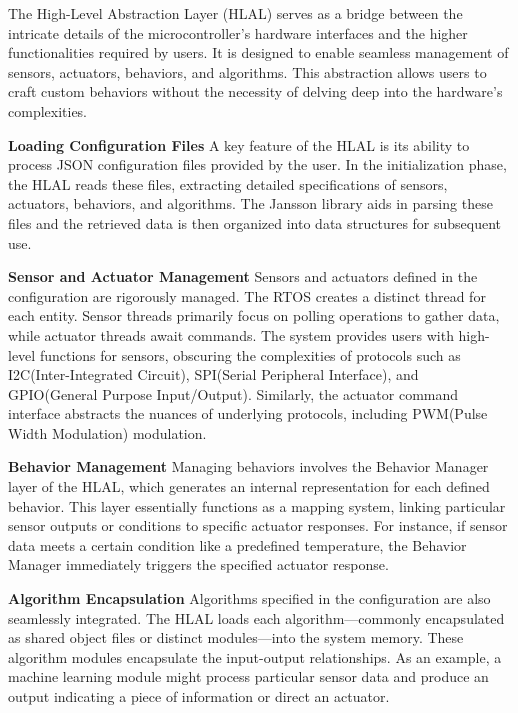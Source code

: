 \documentclass[runningheads]{llncs}
\begin{document}
The High-Level Abstraction Layer (HLAL) serves as a bridge between the intricate details of the microcontroller's hardware interfaces and the higher functionalities required by users. It is designed to enable seamless management of sensors, actuators, behaviors, and algorithms. This abstraction allows users to craft custom behaviors without the necessity of delving deep into the hardware's complexities.

\vspace{0.5cm}
\noindent\textbf{Loading Configuration Files}
A key feature of the HLAL is its ability to process JSON configuration files provided by the user. In the initialization phase, the HLAL reads these files, extracting detailed specifications of sensors, actuators, behaviors, and algorithms. The Jansson library aids in parsing these files and the retrieved data is then organized into data structures for subsequent use.

\vspace{0.5cm}
\noindent\textbf{Sensor and Actuator Management}
Sensors and actuators defined in the configuration are rigorously managed. The RTOS creates a distinct thread for each entity. Sensor threads primarily focus on polling operations to gather data, while actuator threads await commands. The system provides users with high-level functions for sensors, obscuring the complexities of protocols such as I2C(Inter-Integrated Circuit), SPI(Serial Peripheral Interface), and GPIO(General Purpose Input/Output). Similarly, the actuator command interface abstracts the nuances of underlying protocols, including PWM(Pulse Width Modulation) modulation.

\vspace{0.5cm}
\noindent\textbf{Behavior Management}
Managing behaviors involves the Behavior Manager layer of the HLAL, which generates an internal representation for each defined behavior. This layer essentially functions as a mapping system, linking particular sensor outputs or conditions to specific actuator responses. For instance, if sensor data meets a certain condition like a predefined temperature, the Behavior Manager immediately triggers the specified actuator response.

\vspace{0.5cm}
\noindent\textbf{Algorithm Encapsulation}
Algorithms specified in the configuration are also seamlessly integrated. The HLAL loads each algorithm—commonly encapsulated as shared object files or distinct modules—into the system memory. These algorithm modules encapsulate the input-output relationships. As an example, a machine learning module might process particular sensor data and produce an output indicating a piece of information or direct an actuator.
\end{document}
